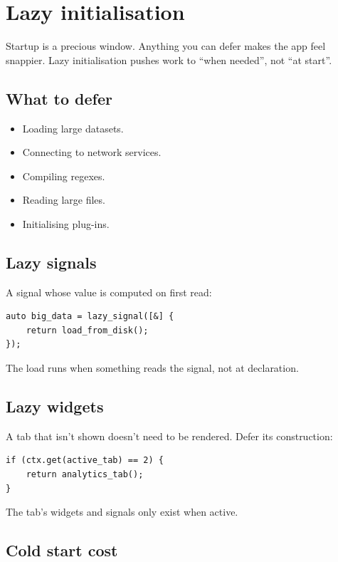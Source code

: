 \chapter{Lazy initialisation}
\label{ch:lazy}

\begin{aside}
Startup is a precious window. Anything you can defer makes
the app feel snappier. Lazy initialisation pushes work to
``when needed'', not ``at start''.
\end{aside}

\section{What to defer}

\begin{itemize}[leftmargin=*]
  \item Loading large datasets.
  \item Connecting to network services.
  \item Compiling regexes.
  \item Reading large files.
  \item Initialising plug-ins.
\end{itemize}

\section{Lazy signals}

A signal whose value is computed on first read:

\begin{lstlisting}
auto big_data = lazy_signal([&] {
    return load_from_disk();
});
\end{lstlisting}

The load runs when something reads the signal, not at
declaration.

\section{Lazy widgets}

A tab that isn't shown doesn't need to be rendered. Defer
its construction:

\begin{lstlisting}
if (ctx.get(active_tab) == 2) {
    return analytics_tab();
}
\end{lstlisting}

The tab's widgets and signals only exist when active.

\section{Cold start cost}

